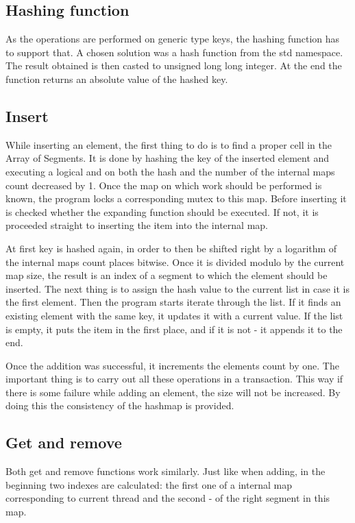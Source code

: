 \subsection{Hashing function}
    As the operations are performed on generic type keys, the hashing function has to support that. A chosen solution was a hash function from the std namespace. The result obtained is then casted to unsigned long long integer. At the end the function returns an absolute value of the hashed key.
    
\subsection{Insert}
    While inserting an element, the first thing to do is to find a proper cell in the Array of Segments. It is done by hashing the key of the inserted element and executing a logical and on both the hash and the number of the internal maps count decreased by 1. Once the map on which work should be performed is known, the program locks a corresponding mutex to this map. Before inserting it is checked whether the expanding function should be executed. If not, it is proceeded straight to inserting the item into the internal map.
        
    At first key is hashed again, in order to then be shifted right by a logarithm of the internal maps count places bitwise. Once it is divided modulo by the current map size, the result is an index of a segment to which the element should be inserted. The next thing is to assign the hash value to the current list in case it is the first element. Then the program starts iterate through the list. If it finds an existing element with the same key, it updates it with a current value. If the list is empty, it puts the item in the first place, and if it is not - it appends it to the end.
        
    Once the addition was successful, it increments the elements count by one. The important thing is to carry out all these operations in a transaction. This way if there is some failure while adding an element, the size will not be increased. By doing this the consistency of the hashmap is provided.
        
\subsection{Get and remove}
    Both get and remove functions work similarly. Just like when adding, in the beginning two indexes are calculated: the first one of a internal map corresponding to current thread and the second - of the right segment in this map. 
        
